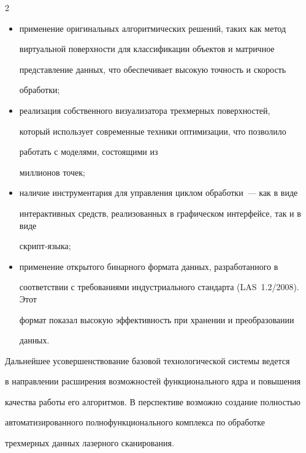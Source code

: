 \begin{multicols}{2}
\begin{itemize}
комплексов обработки данных;

\item применение оригинальных алгоритмических решений, таких как метод 

виртуальной поверхности для классификации объектов и матричное 

представление данных, что обеспечивает высокую точность и скорость 

обработки;

\item реализация собственного визуализатора трехмерных поверхностей, 

который использует современные техники оптимизации, что позволило 

работать с моделями, состоящими из\linebreak

миллионов точек;

\item наличие инструментария для управления цик\-лом обработки~--- как в виде 

интерактивных средств, реализованных в графическом интерфейсе, так и в виде 

скрипт-языка;

\item применение открытого бинарного формата данных, разработанного в 

соответствии с требованиями индустриального стандарта (LAS~1.2/2008). Этот 

формат показал высокую эффективность при хранении и преобразовании 

данных.

\end{itemize}



   Дальнейшее усовершенствование базовой технологической системы ведется 

в направлении расширения возможностей функционального ядра и повышения 

качества работы его алгоритмов. В перспективе возможно создание полностью 

автоматизированного полнофункционального комплекса по обработке 

трехмерных данных лазерного сканирования.

      

{\small\frenchspacing

{%


}}
\end{multicols}
